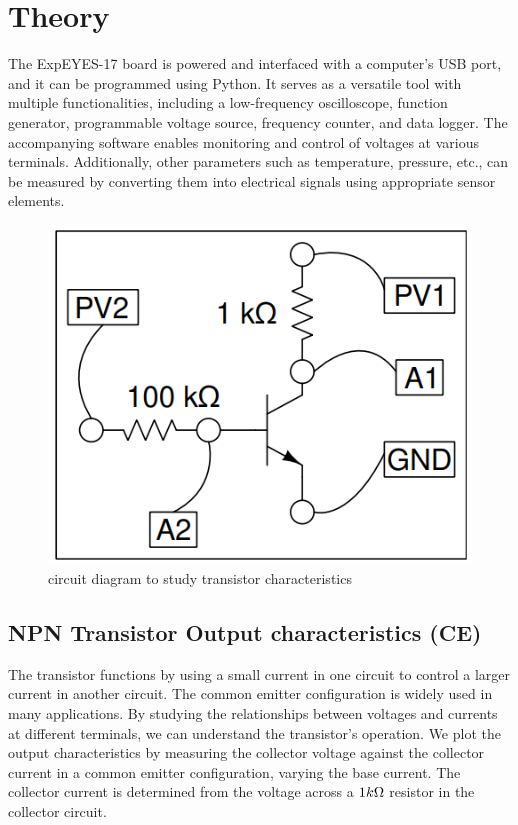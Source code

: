 \section{Theory}
	The ExpEYES-17 board is powered and interfaced with a computer's USB port, and it can be programmed using Python. It serves as a versatile tool with multiple functionalities, including a low-frequency oscilloscope, function generator, programmable voltage source, frequency counter, and data logger. The accompanying software enables monitoring and control of voltages at various terminals. Additionally, other parameters such as temperature, pressure, etc., can be measured by converting them into electrical signals using appropriate sensor elements.%


	\begin{figure}[h]
		\centering
		\includegraphics[width=0.8\columnwidth]{images/e2.png}
		\caption{circuit diagram to study transistor characteristics}
		\label{th:2}
	\end{figure}

	\subsection{NPN Transistor Output characteristics (CE)}
		The transistor functions by using a small current in one circuit to control a larger current in another circuit. The common emitter configuration is widely used in many applications. By studying the relationships between voltages and currents at different terminals, we can understand the transistor's operation. We plot the output characteristics by measuring the collector voltage against the collector current in a common emitter configuration, varying the base current. The collector current is determined from the voltage across a $1k\ohm$ resistor in the collector circuit.

